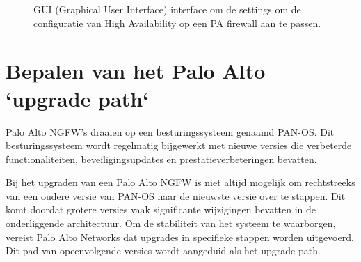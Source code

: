 \begin{figure}[H]
    \centering
    \caption[PA High Availability settings]{\label{fig:PA_HASettings}GUI (Graphical User Interface) interface om de settings om de configuratie van High Availability op een PA firewall aan te passen.}
\end{figure}

\section{Bepalen van het Palo Alto `upgrade path`}

Palo Alto NGFW's draaien op een besturingssysteem genaamd PAN-OS. Dit besturingssysteem wordt regelmatig bijgewerkt met nieuwe versies die verbeterde functionaliteiten, beveiligingsupdates en prestatieverbeteringen bevatten.

Bij het upgraden van een Palo Alto NGFW is niet altijd mogelijk om rechtstreeks van een oudere versie van PAN-OS naar de nieuwste versie over te stappen. Dit komt doordat grotere versies vaak significante wijzigingen bevatten in de onderliggende architectuur. Om de stabiliteit van het systeem te waarborgen, vereist Palo Alto Networks dat upgrades in specifieke stappen worden uitgevoerd. Dit pad van opeenvolgende versies wordt aangeduid als het upgrade path.

